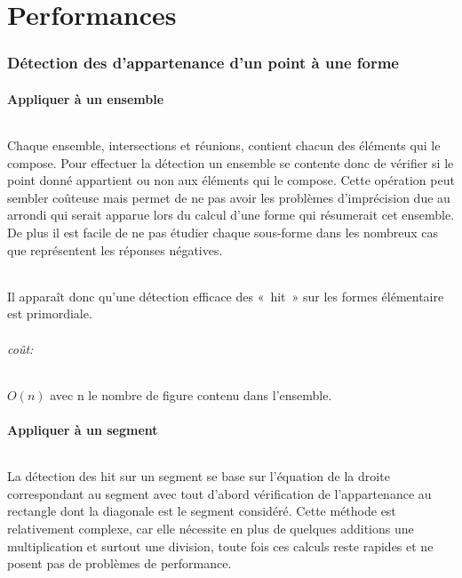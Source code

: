 \part{Performances}

\section{Détection des d’appartenance d'un point à une forme}

\subsection{Appliquer à un ensemble}
\paragraph{}
Chaque ensemble, intersections et réunions, contient chacun des éléments qui le compose. Pour effectuer la détection un ensemble se contente donc de vérifier si le point donné appartient ou non aux éléments qui le compose. Cette opération peut sembler coûteuse mais permet de ne pas avoir les problèmes d’imprécision due au arrondi qui serait apparue lors du calcul d'une forme qui résumerait cet ensemble. De plus il est facile de ne pas étudier chaque sous-forme dans les nombreux cas que représentent les réponses négatives.
\paragraph{}
Il apparaît donc qu'une détection efficace des « hit » sur les formes élémentaire est primordiale.
\paragraph{coût: }
\(O(n)\) avec n le nombre de figure contenu dans l'ensemble.

\subsection{Appliquer à un segment}
\paragraph{}
La détection des hit sur un segment se base sur l’équation de la droite correspondant au segment avec tout d'abord vérification de l’appartenance au rectangle dont la diagonale est le segment considéré. Cette méthode est relativement complexe, car elle nécessite en plus de quelques additions une multiplication et surtout une division, toute fois ces calculs reste rapides et ne posent pas de problèmes de performance.

